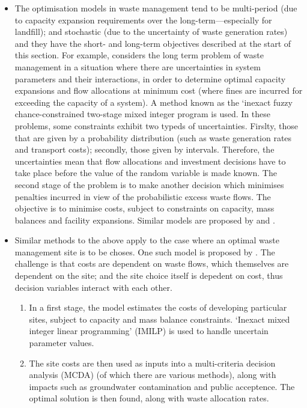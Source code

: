 \begin{itemize}
	\item The optimisation models in waste management tend to be multi-period (due to capacity expansion requirements over the long-term---especially for landfill); and stochastic (due to the uncertainty of waste generation rates) and they have the short- and long-term objectives described at the start of this section. For example, \citet{Guo2009} considers the long term problem of waste management in a situation where there are uncertainties in system parameters and their interactions, in order to determine optimal capacity expansions and flow allocations at minimum cost (where fines are incurred for exceeding the capacity of a system). A method known as the `inexact fuzzy chance-constrained two-stage mixed integer program is used. In these problems, some constraints exhibit two typeds of uncertainties. Firslty, those that are given by a probability distribution (such as waste generation rates and transport costs); secondly, those given by intervals. Therefore, the uncertainties mean that flow allocations and investment decisions have to take place before the value of the random variable is made known. The second stage of the problem is to make another decision which minimises penalties incurred in view of the probabilistic excess waste flows. The objective is to minimise costs, subject to constraints on capacity, mass balances and facility expansions. Similar models are proposed by \citet{Li2006} and \citet{Xi2010}. 
	\item Similar methods to the above apply to the case where an optimal waste management site is to be choses. One such model is proposed by \citet{Cheng2003}. The challenge is that costs are dependent on waste flows, which themselves are dependent on the site; and the site choice itself is depedent on cost, thus decision variables interact with each other.
\begin{enumerate}
	\item In a first stage, the model estimates the costs of developing particular sites, subject to capacity and mass balance constraints. `Inexact mixed integer linear programming' (IMILP) is used to handle uncertain parameter values.
	\item The site costs are then used as inputs into a multi-criteria decision analysis (MCDA) (of which there are various methods), along with impacts such as groundwater contamination and public acceptence. The optimal solution is then found, along with waste allocation rates.
\end{enumerate}
\end{itemize}

